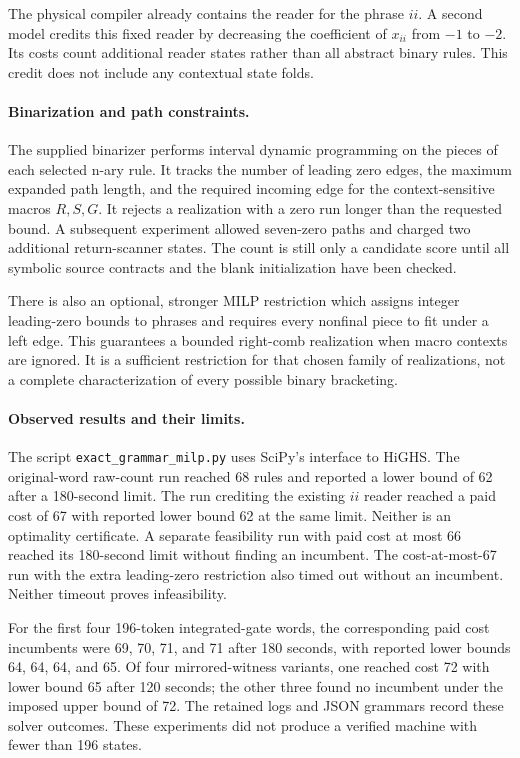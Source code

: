 The physical compiler already contains the reader for the phrase $ii$.
A second model credits this fixed reader by decreasing the coefficient of
$x_{ii}$ from $-1$ to $-2$. Its costs count additional reader states rather
than all abstract binary rules. This credit does not include any contextual
state folds.

\paragraph{Binarization and path constraints.}
The supplied binarizer performs interval dynamic programming on the pieces
of each selected n-ary rule. It tracks the number of leading zero edges,
the maximum expanded path length, and the required incoming edge for the
context-sensitive macros $R,S,G$. It rejects a realization with a zero run
longer than the requested bound. A subsequent experiment allowed seven-zero
paths and charged two additional return-scanner states. The count is still
only a candidate score until all symbolic source contracts and the blank
initialization have been checked.

There is also an optional, stronger MILP restriction which assigns integer
leading-zero bounds to phrases and requires every nonfinal piece to fit
under a left edge. This guarantees a bounded right-comb realization when
macro contexts are ignored. It is a sufficient restriction for that chosen
family of realizations, not a complete characterization of every possible
binary bracketing.

\paragraph{Observed results and their limits.}
The script \texttt{exact\_grammar\_milp.py} uses SciPy's interface to HiGHS.
The original-word raw-count run reached 68 rules and reported a lower bound
of 62 after a 180-second limit. The run crediting the existing $ii$ reader
reached a paid cost of 67 with reported lower bound 62 at the same limit.
Neither is an optimality certificate. A separate feasibility run with paid
cost at most 66 reached its 180-second limit without finding an incumbent.
The cost-at-most-67 run with the extra leading-zero restriction also timed
out without an incumbent. Neither timeout proves infeasibility.

For the first four 196-token integrated-gate words, the corresponding paid
cost incumbents were 69, 70, 71, and 71 after 180 seconds, with reported
lower bounds 64, 64, 64, and 65. Of four mirrored-witness variants, one
reached cost 72 with lower bound 65 after 120 seconds; the other three found
no incumbent under the imposed upper bound of 72. The retained logs and
JSON grammars record these solver outcomes. These experiments did not
produce a verified machine with fewer than 196 states.
